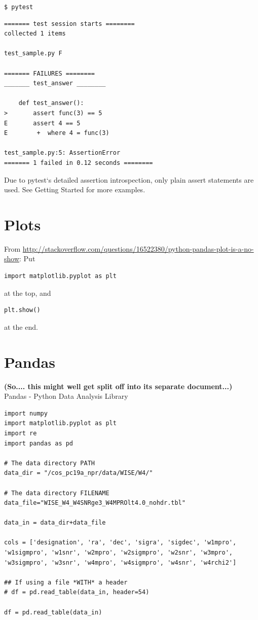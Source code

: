 \documentclass[11pt,a4paper]{article}
\begin{document}
\noindent
{\tt \$ pytest}
\begin{lstlisting}
======= test session starts ========
collected 1 items

test_sample.py F

======= FAILURES ========
_______ test_answer ________

    def test_answer():
>       assert func(3) == 5
E       assert 4 == 5
E        +  where 4 = func(3)

test_sample.py:5: AssertionError
======= 1 failed in 0.12 seconds ========
\end{lstlisting}

Due to pytest‘s detailed assertion introspection, only plain assert
statements are used. See Getting Started for more examples.





\newpage
\section{Plots}

From \href{http://stackoverflow.com/questions/16522380/python-pandas-plot-is-a-no-show}{http://stackoverflow.com/questions/16522380/python-pandas-plot-is-a-no-show}: 
Put
\begin{lstlisting}
import matplotlib.pyplot as plt
\end{lstlisting}
at the top, and
\begin{lstlisting}
plt.show()
\end{lstlisting}
at the end.



\newpage
\section{Pandas}
{\bf (So.... this might well get split off into its separate
document...)}\\

Pandas - Python Data Analysis Library\\


\smallskip
\smallskip
\noindent 
\begin{lstlisting}
import numpy
import matplotlib.pyplot as plt
import re
import pandas as pd 

# The data directory PATH
data_dir = "/cos_pc19a_npr/data/WISE/W4/"

# The data directory FILENAME
data_file="WISE_W4_W4SNRge3_W4MPROlt4.0_nohdr.tbl"

data_in = data_dir+data_file

cols = ['designation', 'ra', 'dec', 'sigra', 'sigdec', 'w1mpro', 'w1sigmpro', 'w1snr', 'w2mpro', 'w2sigmpro', 'w2snr', 'w3mpro', 'w3sigmpro', 'w3snr', 'w4mpro', 'w4sigmpro', 'w4snr', 'w4rchi2']

## If using a file *WITH* a header
# df = pd.read_table(data_in, header=54) 

df = pd.read_table(data_in) 
\end{lstlisting}
\end{document}
